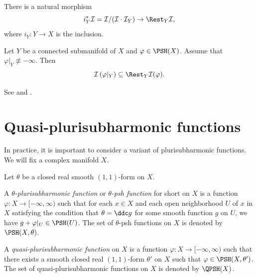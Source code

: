 There is a natural morphism
\begin{equation}\label{eq:pullbacktoinverimage}
    i_Y^*\mathcal{I}=  \mathcal{I}/(\mathcal{I}\cdot \mathcal{I}_Y)\rightarrow \Rest_Y \mathcal{I},
\end{equation}
where $i_Y\colon Y\rightarrow X$ is the inclusion.

\begin{theorem}\label{thm:OT}
    Let $Y$ be a connected submanifold of $X$ and $\varphi\in \PSH(X)$. Assume that $\varphi|_Y\not\equiv -\infty$. Then
    \[
    \mathcal{I}\left(\varphi|_Y\right)\subseteq \Rest_Y\mathcal{I}(\varphi).
    \]
\end{theorem}
See \cite[Theorem~14.1]{Dem12} and \cite[Theorems~11.4.4 and~12.4.1]{FPT}.


\section{Quasi-plurisubharmonic functions}
\label{sec:qpsh}
In practice, it is important to consider a variant of plurisubharmonic functions. We will fix a complex manifold $X$.

\begin{definition}\label{def:qpsh} Let $\theta$ be a closed real smooth $(1,1)$-form on $X$.

    A \emph{$\theta$-plurisubharmonic function} or \emph{$\theta$-psh function} for short on $X$ is a function $\varphi\colon X\rightarrow [-\infty,\infty)$ such that for each $x\in X$ and each open neighborhood $U$ of $x$ in $X$ satisfying the condition that $\theta=\ddc g$ for some smooth function $g$ on $U$, we have $g+\varphi|_U\in \PSH(U)$. The set of $\theta$-psh functions on $X$ is denoted by $\PSH(X,\theta)$. 

    A \emph{quasi-plurisubharmonic function}  on $X$ is a function $\varphi\colon X\rightarrow [-\infty,\infty)$ such that there exists a smooth closed real $(1,1)$-form $\theta'$ on $X$ such that $\varphi\in \PSH(X,\theta')$. The set of quasi-plurisubharmonic functions on $X$ is denoted by $\QPSH(X)$.
\end{definition}

